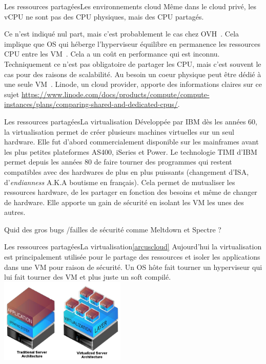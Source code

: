 \documentclass{beamer}
\begin{document}
    \begin{frame}{Les ressources partagées}{Les environnements cloud}
        Même dans le cloud privé, les vCPU ne sont pas des CPU physiques, mais des CPU partagés.

        Ce n'est indiqué nul part, mais c'est probablement le cas chez OVH~.
        Cela implique que OS qui héberge l'hyperviseur équilibre en permanence les ressources CPU entre les VM~.
        Cela a un coût en performance qui est inconnu.
        \bigbreak
        Techniquement ce n'est pas obligatoire de partager les CPU, mais c'est souvent le cas pour des raisons de scalabilité.
        Au besoin un coeur physique peut être dédié à une seule VM~.
        \bigbreak
        Linode, un cloud provider, apporte des informations claires sur ce sujet \url{https://www.linode.com/docs/products/compute/compute-instances/plans/comparing-shared-and-dedicated-cpus/}.

    \end{frame}

    \begin{frame}{Les ressources partagées}{La virtualisation}
        Développée par IBM dès les années 60, la virtualisation permet de créer plusieurs machines virtuelles sur un seul hardware.
        Elle fut d'abord commercialement disponible sur les mainframes avant les plus petites plateformes AS400, iSeries et Power.
        Le technologie TIMI d'IBM permet depuis les années 80 de faire tourner des programmes qui restent compatibles avec des hardwares de plus en plus puissants (changement d'ISA, d'\textit{endianness} A.K.A boutisme en français).
        \bigbreak
        Cela permet de mutualiser les ressources hardware, de les partager en fonction des besoins et même de changer de hardware.
        \bigbreak
        Elle apporte un gain de sécurité en isolant les VM les unes des autres.
        \begin{dangercolorbox}
            Quid des gros bugs /failles de sécurité comme Meltdown et Spectre ?
        \end{dangercolorbox}
    \end{frame}

    \begin{frame}{Les ressources partagées}{La virtualisation\cref{arcuscloud}}
        Aujourd'hui la virtualisation est principalement utilisée pour le partage des ressources et isoler les applications dans une VM pour raison de sécurité.
        Un OS hôte fait tourner un hyperviseur qui lui fait tourner des VM et plus juste un soft compilé.
        \bigbreak
        \centering
        \includegraphics[width=6cm]{image/virtualisation}
    \end{frame}
\end{document}

